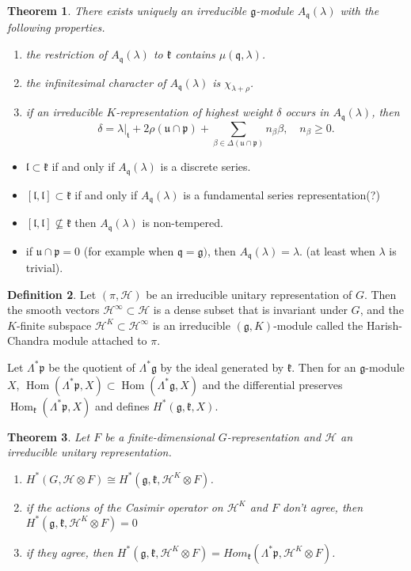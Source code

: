 \documentclass[leqno]{amsart}
\newcommand{\1}{\mathbf{1}}
\newcommand{\cfg}{\mathfrak{g}}
\newcommand{\cfk}{\mathfrak{k}}
\newcommand{\cfp}{\mathfrak{p}}
\newcommand{\cfq}{\mathfrak{q}}
\newcommand{\cfu}{\mathfrak{u}}
\newcommand{\cfl}{\mathfrak{l}}
\newcommand{\cft}{\mathfrak{t}}
\DeclareMathOperator{\Hom}{Hom}
\newtheorem{thm}{Theorem}[section]
\theoremstyle{definition}
\newtheorem{defn}[thm]{Definition}
\theoremstyle{remark}
\begin{document}
\begin{thm}
	There exists uniquely an irreducible $\cfg$-module
	$A_\cfq(\lambda)$ with the following properties.
	  \begin{enumerate}[label=(\alph*)]
		  \item the restriction of $A_\cfq(\lambda)$
			to $\cfk$ contains $\mu(\cfq,\lambda)$.
		\item the infinitesimal character of 
			$A_\cfq(\lambda)$ is $\chi_{\lambda+\rho}$.
		\item if an irreducible $K$-representation of 
			highest weight $\delta$ occurs in
			$A_\cfq(\lambda)$, then 
			 \[
				\delta=\lambda\vert_{\cft}
				+2\rho(\cfu\cap\cfp)
			+\sum_{\beta\in \Delta(\cfu\cap\cfp)}
				n_\beta\beta,\quad n_\beta\geq 0.
			\]
	 \end{enumerate}
\end{thm}
\begin{itemize}
	\item $\cfl\subset\cfk$ if and only if $A_\cfq(\lambda)$
		is a discrete series.
	\item  $[\cfl,\cfl]\subset\cfk$ if and only if
		$A_\cfq(\lambda)$ is a fundamental series 
		representation(?) 
	\item  $[\cfl,\cfl]\nsubseteq\cfk$ then
		$A_\cfq(\lambda)$ is non-tempered.
	\item if  $\cfu\cap\cfp=0$ 
		(for example when  $\cfq=\cfg)$,
		then  $A_\cfq(\lambda)=\lambda$.
		(at least when $\lambda$ is trivial).
\end{itemize}

\begin{defn}
	 Let $(\pi,\mathcal{H})$
	 be an irreducible unitary 
	 representation of $G$.
	 Then the smooth vectors
	 $\mathcal{H}^\infty\subset \mathcal{H}$
	  is a dense subset that is 
	  invariant under $G$,
	  and the  $K$-finite subspace
	  $\mathcal{H}^K\subset\mathcal{H}^\infty$
	  is an irreducible  $(\cfg, K)$-module
	  called the Harish-Chandra module
	  attached to  $\pi$.
\end{defn}



Let $\Lambda^*\cfp$ be the quotient of   $\Lambda^*\cfg$
by the ideal generated by  $\cfk$.
Then for an $\cfg$-module  $X$,
$\Hom(\Lambda^*\cfp,X)\subset \Hom(\Lambda^*\cfg,X)$
and the differential preserves $\Hom_\cfk(\Lambda^*\cfp,X)$
and defines  $H^*(\cfg,\cfk,X)$.

\begin{thm}
	Let $F$ be a finite-dimensional $G$-representation
	and  $\mathcal{H}$ an irreducible unitary representation.
	\begin{enumerate}[label=(\alph*)]
		\item $H^*(G,\mathcal{H}\otimes F)\cong 
			H^*(\cfg,\cfk,\mathcal{H}^K\otimes F)$.
		\item if the actions of the Casimir operator
			on $\mathcal{H}^K$ and $F$
			don't agree, then
			$H^*(\cfg,\cfk,\mathcal{H}^K\otimes F)=0$
		\item if they agree, then
			 $H^*(\cfg,\cfk,\mathcal{H}^K\otimes F)=
		  Hom_\cfk(\Lambda^*\cfp,\mathcal{H}^K\otimes F)$.
	\end{enumerate}
\end{thm}
\end{document}
